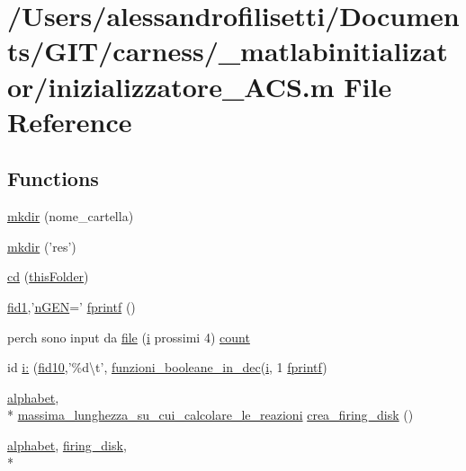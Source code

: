 \hypertarget{a00110}{\section{/\-Users/alessandrofilisetti/\-Documents/\-G\-I\-T/carness/\-\_\-matlabinitializator/inizializzatore\-\_\-\-A\-C\-S.m File Reference}
\label{a00110}
}
\subsection*{Functions}
\begin{DoxyCompactItemize}
\item 
\hyperlink{a00110_abcaf3fe79479456b56924747f1bca0d9}{mkdir} (nome\-\_\-cartella)
\item 
\hyperlink{a00110_ae58a11ed5ac7873b1039a391d5c86a05}{mkdir} ('res')
\item 
\hyperlink{a00110_a767271ad82d244871370a0f0e6a7f8a4}{cd} (\hyperlink{a00113_a2d4125646b62462ce279d82913125ccf}{this\-Folder})
\item 
\hyperlink{a00110_aff1e821fc5f97a0758f74b5cbd00cacf}{fid1},'\hyperlink{a00112_a82556659f7ba7219e55a18e9b9e63873}{n\-G\-E\-N}=' \hyperlink{a00110_aa6dc40efe43a338c9ff278260d95b4d9}{fprintf} ()
\item 
perch sono input da \hyperlink{a00110_a4e8353d6c62cf54bf4a1a8f63e56b8c3}{file} (\hyperlink{a00113_ad3efca1ea6e3333daf30719ee0501862}{i} prossimi 4) \hyperlink{a00110_aa0a4866d2600caeb20cfacee8eefc922}{count}
\item 
id \hyperlink{a00110_ab5fb59cb99841dd445fbd224275fa226}{i\-:} (\hyperlink{a00110_aadad4fd2d661ea2b9f0c3a95e3f7b4ba}{fid10},'\%d\textbackslash{}t', \hyperlink{a00113_aca80ac3e93dabd95e623a51f90fb37b6}{funzioni\-\_\-booleane\-\_\-in\-\_\-dec}(\hyperlink{a00113_ad3efca1ea6e3333daf30719ee0501862}{i}, 1 \hyperlink{a00110_aa6dc40efe43a338c9ff278260d95b4d9}{fprintf})
\item 
\hyperlink{a00113_abcbc32fc68e4323620d6171a17310212}{alphabet}, \\*
\hyperlink{a00113_a4e714d8e6551275aafab501b8c9f18ad}{massima\-\_\-lunghezza\-\_\-su\-\_\-cui\-\_\-calcolare\-\_\-le\-\_\-reazioni} \hyperlink{a00110_a9436783422a447fac5122c24d195e61d}{crea\-\_\-firing\-\_\-disk} ()
\item 
\hyperlink{a00113_abcbc32fc68e4323620d6171a17310212}{alphabet}, \hyperlink{a00103_acb72987b5000cf59c6f81c482e2ac8ac}{firing\-\_\-disk}, \\*

\end{DoxyCompactItemize}
